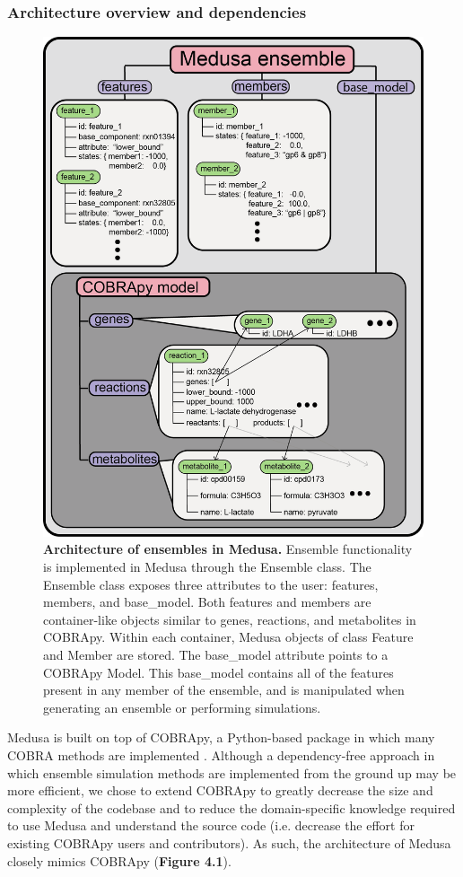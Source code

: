 \documentclass[11pt,twocolumn,notitlepage,openany,twoside]{book}
\begin{document}
\begin{refsection}
\subsubsection{Architecture overview and dependencies}

\begin{figure}[tb]
\centering
\includegraphics[width=0.9\linewidth]{ch4_fig1}
\caption[ Architecture of ensembles in Medusa.]{\textbf{ Architecture of ensembles in Medusa.} Ensemble functionality is implemented in Medusa through the Ensemble class. The Ensemble class exposes three attributes to the user: features, members, and base\_model. Both features and members are container-like objects similar to genes, reactions, and metabolites in COBRApy. Within each container, Medusa objects of class Feature and Member are stored. The base\_model attribute points to a COBRApy Model. This base\_model contains all of the features present in any member of the ensemble, and is manipulated when generating an ensemble or performing simulations.}
\end{figure}

Medusa is built on top of COBRApy, a Python-based package in which many COBRA methods are implemented \cite{Ebrahim2013-eb}. Although a dependency-free approach in which ensemble simulation methods are implemented from the ground up may be more efficient, we chose to extend COBRApy to greatly decrease the size and complexity of the codebase and to reduce the domain-specific knowledge required to use Medusa and understand the source code (i.e. decrease the effort for existing COBRApy users and contributors). As such, the architecture of Medusa closely mimics COBRApy (\textbf{Figure 4.1}).


\end{refsection}
\end{document}
